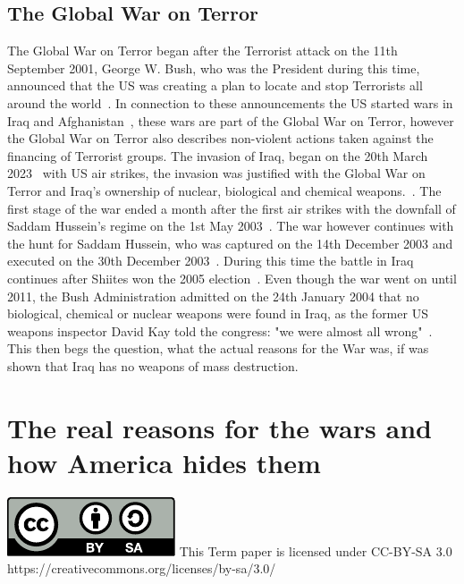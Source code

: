 \documentclass[12pt,a4paper]{article}
\begin{document}
		\subsection{The Global War on Terror}
		The Global War on Terror began after the Terrorist attack on the 11th September 2001, George W. Bush, who was the President during this time, announced that the US was creating a plan to locate and stop Terrorists all around the world~\cite{gowt-bushlibrary}. In connection to these announcements the US started wars in Iraq and Afghanistan~\cite{gowt-bushlibrary}, these wars are part of the Global War on Terror, however the Global War on Terror also describes non-violent actions taken against the financing of Terrorist groups.
		The invasion of Iraq, began on the 20th March 2023~\cite{cfr-iraq-war} with US air strikes, the invasion was justified with the Global War on Terror and Iraq's ownership of nuclear, biological and chemical weapons.~\cite{britannica-iraq-war}. The first stage of the war ended a month after the first air strikes with the downfall of Saddam Hussein's regime on the 1st May 2003~\cite{cfr-iraq-war}. 
		The war however continues with the hunt for Saddam Hussein, who was captured on the 14th December 2003 and executed on the 30th December 2003~\cite{cfr-iraq-war}. During this time the battle in Iraq continues after Shiites won the 2005 election~\cite{cfr-iraq-war}.
		Even though the war went on until 2011, the Bush Administration admitted on the 24th January 2004 that no biological, chemical or nuclear weapons were found in Iraq, as the former US weapons inspector David Kay told the congress: "we were almost all wrong"~\cite{cnn-david-kay-senate-hearing}.
		This then begs the question, what the actual reasons for the War was, if was shown that Iraq has no weapons of mass destruction.
	\section{The real reasons for the wars and how America hides them}
		
	\newpage
	{
		{}
		
		\includegraphics{by-sa.pdf}
		This Term paper is licensed under CC-BY-SA 3.0\\
		https://creativecommons.org/licenses/by-sa/3.0/
	}
\end{document}
